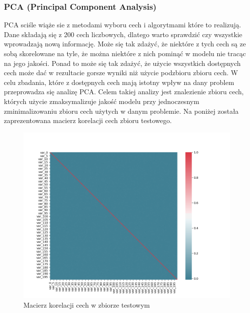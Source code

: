 \documentclass[12pt]{article}
\begin{document}
\subsubsection{PCA (Principal Component Analysis)}
PCA sciśle wiąże sie z metodami wyboru cech i algorytmami które to realizują.
Dane składają się z 200 cech liczbowych, dlatego warto sprawdzić czy wszystkie wprowadzają nową informację. Może się tak zdażyć, że niektóre z tych cech są ze sobą skorelowane na tyle, że można niektóre z nich pominąć w modelu nie tracąc na jego jakości. Ponad to może się tak zdażyć, że użycie wszystkich dostępnych cech może dać w rezultacie gorsze wyniki niż użycie podzbioru zbioru cech. W celu zbadania, które z dostępnych cech mają istotny wpływ na dany problem przeprowadza się analizę PCA. Celem takiej analizy jest znalezienie zbioru cech, których użycie zmaksymalizuje jakość modelu przy jednoczesnym zminimalizowaniu zbioru cech użytych w danym problemie.
\newline
Na poniżej została zaprezentowana macierz korelacji cech zbioru testowego.
\begin{figure}[H]
\centering 
\includegraphics[width = 472pt]{feature_correlation_matrix}
\caption{Macierz korelacji cech w zbiorze testowym}
\label{feature_correlation_matrix}
\end{figure}
\end{document}
